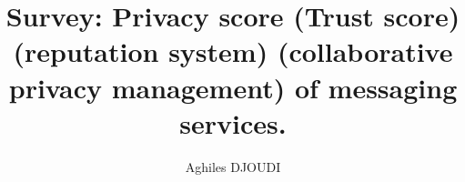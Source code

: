 \documentclass{../../setup/sig-alternate}
\begin{document}
\title{Survey: Privacy score (Trust score) (reputation system) (collaborative privacy management) of messaging services.
}


\author{
	\alignauthor
	Aghiles DJOUDI \titlenote{ }\\
		\\
		\\
}









%
%

\printbibliography

\onecolumn


\end{document}
